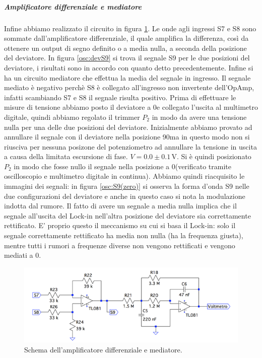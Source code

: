 \documentclass[10pt,a4paper]{article}
\begin{document}
\subparagraph{Amplificatore differenziale e mediatore}
Infine abbiamo realizzato il circuito in figura \ref{fig:amplificatorediff-mediatore}. Le onde agli ingressi S7 e S8 sono sommate dall'amplificatore differenziale, il quale amplifica la differenza, così da ottenere un output di segno definito o a media nulla, a seconda della posizione del deviatore. In figura \ref{osc:devS9} si trova il segnale S9 per le due posizioni del deviatore, i risultati sono in accordo con quanto detto precedentemente.
Infine si ha un circuito mediatore che effettua la media del segnale in ingresso. %
Il segnale mediato è negativo perchè S8 è collegato all'ingresso non invertente dell'OpAmp, infatti scambiando S7 e S8 il segnale risulta positivo.
 Prima di effettuare le misure di tensione abbiamo posto il deviatore a 0\degree e collegato l'uscita al multimetro digitale, quindi abbiamo regolato il trimmer $P_2$ in modo da avere una tensione nulla per una delle due posizioni del deviatore. Inizialmente abbiamo provato ad annullare il segnale con il deviatore nella posizione 90\degree ma in questo modo non si riusciva per nessuna posizone del potenziometro ad annullare la tensione in uscita a causa della limitata escursione di fase. $V=0.0\pm0.1\,\mbox{V}$. Si è quindi posizionato $P_2$ in modo che fosse nullo il segnale nella posizione a 0\degree (verificato tramite oscilloscopio e multimetro digitale in continua). Abbiamo quindi riacquisito le immagini dei segnali: in figura \ref{osc:S9(zero)} si osserva la forma d'onda S9 nelle due configurazioni del deviatore e anche in questo caso si nota la modulazione indotta dal rumore. Il fatto di avere un segnale a media nulla implica che il segnale all'uscita del Lock-in nell'altra posizione del deviatore sia correttamente rettificato. E' proprio questo il meccanismo su cui si basa il Lock-in: solo il segnale correttamente rettificato ha media non nulla (ha la frequenza giusta), mentre tutti i rumori a frequenze diverse non vengono rettificati e vengono mediati a 0.

\begin{figure}[!htb]
  \centering
  \includegraphics[scale=0.75]{amplificatorediff-mediatore.png}
\caption{Schema dell'amplificatore differenziale e mediatore.\label{fig:amplificatorediff-mediatore}}
\end{figure}
\end{document}
